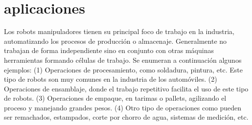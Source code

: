 \documentclass[11pt,a4paper,oldfontcommands,oneside]{memoir}
\begin{document}
\section{aplicaciones}
Los robots manipuladores tienen su principal foco de trabajo en la industria, automatizando los procesos de producción o almacenaje. Generalmente no trabajan de forma independiente sino en conjunto con otras máquinas herramientas formando células de trabajo. Se enumeran a continuación algunos ejemplos: (1) Operaciones de procesamiento, como soldadura, pintura, etc. Este tipo de robots son muy comunes en la industria de los automóviles. (2) Operaciones de ensamblaje, donde el trabajo repetitivo facilita el uso de este tipo de robots. (3) Operaciones de empaque, en tarimas o pallets, agilizando el proceso y manejando grandes pesos. (4) Otro tipo de operaciones como pueden ser remachados, estampados, corte por chorro de agua, sistemas de medición, etc.
\vspace{1.5cm}\cite{de2006robotica}
\cite{baturone2005robotica}



\end{document}
